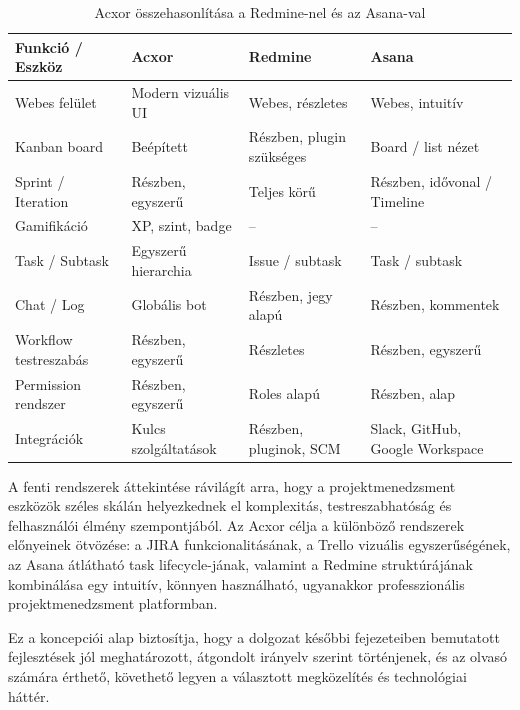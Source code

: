 \begin{table}[h!]
\centering
\caption{Acxor összehasonlítása a Redmine-nel és az Asana-val \cite{redmine, asana}}
\label{tab:comparison2}
\scriptsize
\setlength{\arrayrulewidth}{0.5pt}
\begin{tabularx}{\textwidth}{|l|>{\raggedright\arraybackslash}X|>{\raggedright\arraybackslash}p{2.6cm}|>{\raggedright\arraybackslash}X|}
\hline
\textbf{Funkció / Eszköz} & \textbf{Acxor} & \textbf{Redmine} & \textbf{Asana} \\
\hline
Webes felület & Modern vizuális UI & Webes, részletes & Webes, intuitív \\
Kanban board & Beépített & Részben, plugin szükséges & Board / list nézet \\
Sprint / Iteration & Részben, egyszerű & Teljes körű & Részben, idővonal / Timeline \\
Gamifikáció & XP, szint, badge & -- & -- \\
Task / Subtask & Egyszerű hierarchia & Issue / subtask & Task / subtask \\
Chat / Log & Globális bot & Részben, jegy alapú & Részben, kommentek \\
Workflow testreszabás & Részben, egyszerű & Részletes & Részben, egyszerű \\
Permission rendszer & Részben, egyszerű & Roles alapú & Részben, alap \\
Integrációk & Kulcs szolgáltatások & Részben, pluginok, SCM & Slack, GitHub, Google Workspace \\
\hline
\end{tabularx}
\end{table}

A fenti rendszerek áttekintése rávilágít arra, hogy a projektmenedzsment eszközök széles skálán helyezkednek el komplexitás, testreszabhatóság és felhasználói élmény szempontjából. Az Acxor célja a különböző rendszerek előnyeinek ötvözése: a JIRA funkcionalitásának, a Trello vizuális egyszerűségének, az Asana átlátható task lifecycle-jának, valamint a Redmine struktúrájának kombinálása egy intuitív, könnyen használható, ugyanakkor professzionális projektmenedzsment platformban.

Ez a koncepciói alap biztosítja, hogy a dolgozat későbbi fejezeteiben bemutatott fejlesztések jól meghatározott, átgondolt irányelv szerint történjenek, és az olvasó számára érthető, követhető legyen a választott megközelítés és technológiai háttér.